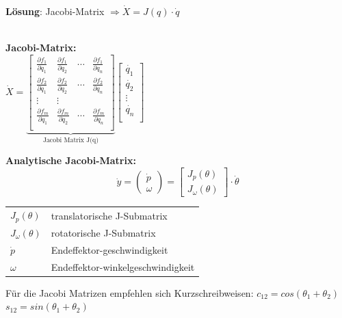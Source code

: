 \textbf{Lösung}: Jacobi-Matrix $ \Longrightarrow \dot{X}=J(q)\cdot \dot{q}$ \\ \\
\begin{minipage}{6cm}
\textbf{Jacobi-Matrix:} \\
$ \dot{X} = 
\underbrace{
\begin{bmatrix} 
\frac{\partial f_1}{\partial q_1} & \frac{\partial f_1}{\partial q_2} & \cdots & \frac{\partial f_1}{\partial q_{n}} \\
\frac{\partial f_2}{\partial q_1} & \frac{\partial f_2}{\partial q_2} & \cdots & \frac{\partial f_2}{\partial q_{n}} \\ 
\vdots & \vdots \\
\frac{\partial f_m}{\partial q_1} & \frac{\partial f_m}{\partial q_2} & \cdots & \frac{\partial f_m}{\partial q_{n}} \\
\end{bmatrix} }_{\text{Jacobi Matrix J(q)}}
\begin{bmatrix} 
\dot{q_1}\\
\dot{q_2}\\
\vdots \\
\dot{q_n}\\
\end{bmatrix} 
$
\end{minipage}
\begin{minipage}{12cm}
\begin{minipage}[b]{6cm}
    \textbf{Analytische Jacobi-Matrix:}\newline
    \[ \dot{y}=\begin{pmatrix}
    \dot{p}\\
    \omega
    \end{pmatrix}=
    \begin{bmatrix}
    J_p(\theta)\\
    J_\omega(\theta)
    \end{bmatrix} 
    \cdot \dot{\theta}\]     
\end{minipage}
\begin{minipage}{5cm}
\begin{tabular}{ll}
    $ J_p(\theta)$& translatorische J-Submatrix\\
    $ J_\omega(\theta)$& rotatorische J-Submatrix \\
    $ \dot{p}$& Endeffektor-geschwindigkeit\\
    $  \omega$& Endeffektor-winkelgeschwindigkeit\\
\end{tabular}
\end{minipage}

Für die Jacobi Matrizen
empfehlen sich
Kurzschreibweisen:\newline
$ c_{12}=cos(\theta_{1} + \theta_{2}) $ \qquad
$ s_{12}=sin(\theta_{1} + \theta_{2}) $

\end{minipage}\\ \\


